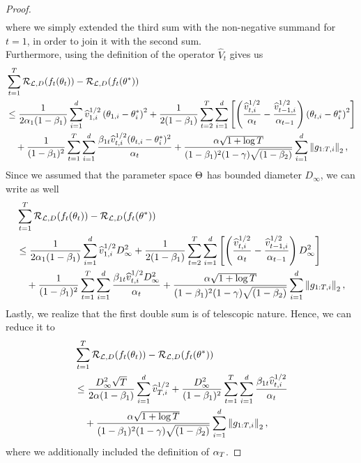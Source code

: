 \begin{proof}
\begin{align*}
\end{align*}
where we simply extended the third sum with the non-negative summand for $t=1$, in order to join it with the second sum.\\
Furthermore, using the definition of the operator $\hat{V}_t$ gives us
\begin{align*}
&\sum_{t=1}^T \operatorname{\mathcal{R}}_{\operatorname{\mathcal{L}}, D}(f_t(\theta_t)) - \operatorname{\mathcal{R}}_{\operatorname{\mathcal{L}}, D}(f_t(\theta^{\ast}))\\
&\leq \frac{1}{2\alpha_1(1-\beta_{1})}\sum_{i=1}^d\widehat{v}_{1,i}^{1/2}\left( \theta_{1,i} - \theta_i^{\ast} \right)^2
+ \frac{1}{2(1-\beta_{1})}\sum_{t=2}^T \sum_{i=1}^d \left[ \left(\frac{\widehat{v}_{t,i}^{1/2}}{\alpha_{t}} - \frac{\widehat{v}_{t-1,i}^{1/2}}{\alpha_{t-1}} \right) \left( \theta_{t, i} - \theta_{i}^{\ast} \right)^2\right]\\
&\quad + \frac{1}{(1-\beta_{1})^2}\sum_{t=1}^T \sum_{i=1}^d \frac{\beta_{1t}\widehat{v}_{t,i}^{1/2} (\theta_{t,i} - \theta_{i}^{\ast})^2}{\alpha_t}
+ \frac{\alpha\sqrt{1 +\log T}}{(1-\beta_1)^2(1-\operatorname{\gamma})\sqrt{(1-\beta_2)}} \sum_{i=1}^{d} \left\|g_{1:T,i} \right\|_2,
\end{align*}
Since we assumed that the parameter space $\operatorname{\Theta}$ has bounded diameter $D_\infty$, we can write as well
\begin{align*}
&\sum_{t=1}^T \operatorname{\mathcal{R}}_{\operatorname{\mathcal{L}}, D}(f_t(\theta_t)) - \operatorname{\mathcal{R}}_{\operatorname{\mathcal{L}}, D}(f_t(\theta^{\ast}))\\
&\leq \frac{1}{2\alpha_1(1-\beta_{1})}\sum_{i=1}^d\widehat{v}_{1,i}^{1/2}D_\infty^2
+ \frac{1}{2(1-\beta_{1})}\sum_{t=2}^T \sum_{i=1}^d \left[ \left(\frac{\widehat{v}_{t,i}^{1/2}}{\alpha_{t}} - \frac{\widehat{v}_{t-1,i}^{1/2}}{\alpha_{t-1}} \right) D_\infty^2\right]\\
&\quad + \frac{1}{(1-\beta_{1})^2}\sum_{t=1}^T \sum_{i=1}^d \frac{\beta_{1t}\widehat{v}_{t,i}^{1/2} D_\infty^2}{\alpha_t}
+ \frac{\alpha\sqrt{1 +\log T}}{(1-\beta_1)^2(1-\operatorname{\gamma})\sqrt{(1-\beta_2)}} \sum_{i=1}^{d} \left\|g_{1:T,i} \right\|_2,
\end{align*}
Lastly, we realize that the first double sum is of telescopic nature. Hence, we can reduce it to
\begin{align*}
&\sum_{t=1}^T \operatorname{\mathcal{R}}_{\operatorname{\mathcal{L}}, D}(f_t(\theta_t)) - \operatorname{\mathcal{R}}_{\operatorname{\mathcal{L}}, D}(f_t(\theta^{\ast}))\\
&\leq \frac{D_\infty^2\sqrt{T}}{2\alpha(1-\beta_{1})}\sum_{i=1}^d\widehat{v}_{T,i}^{1/2}
+ \frac{D_\infty^2}{(1-\beta_{1})^2}\sum_{t=1}^T \sum_{i=1}^d \frac{\beta_{1t}\widehat{v}_{t,i}^{1/2}}{\alpha_t}\\
&\quad + \frac{\alpha\sqrt{1 +\log T}}{(1-\beta_1)^2(1-\operatorname{\gamma})\sqrt{(1-\beta_2)}} \sum_{i=1}^{d} \left\|g_{1:T,i} \right\|_2,
\end{align*}
where we additionally included the definition of $\alpha_T$.
\end{proof}

